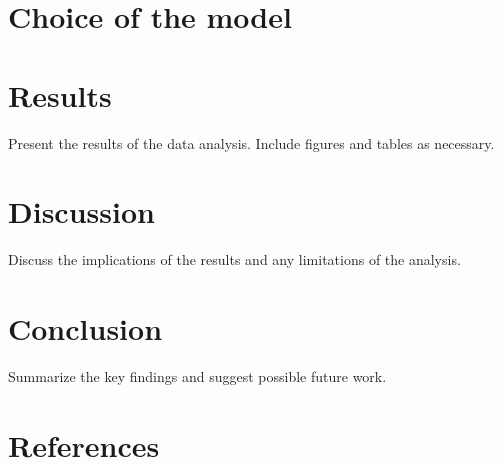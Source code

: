 \documentclass{article}
\begin{document}
\section{Choice of the model}
\label{sec:model}


\section{Results}
\label{sec:results}
Present the results of the data analysis. Include figures and tables as necessary.


\section{Discussion}
\label{sec:discussion}
Discuss the implications of the results and any limitations of the analysis.

\section{Conclusion}
\label{sec:conclusion}
Summarize the key findings and suggest possible future work.

\section{References}
\label{sec:references}


\end{document}

